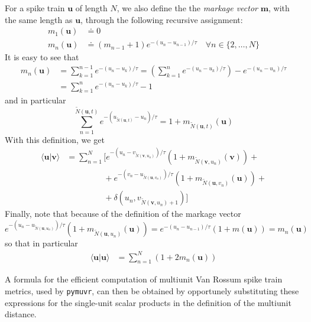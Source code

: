 \documentclass[11pt,a4paper]{article}
\newcommand{\braket}[2]{\langle #1|#2 \rangle}
\newcommand{\bu}{\boldsymbol{u}}
\newcommand{\bv}{\boldsymbol{v}}
\newcommand{\mkg}{\boldsymbol{m}}
\newcommand{\Nmax}[2]{\tilde{N}\left( #1, #2\right)}
\begin{document}
For a spike train $\bu$ of length $N$, we also define the the
\emph{markage vector} $\mkg$, with the same length as $\bu$, through
the following recursive assignment:
\begin{align}
  m_1(\bu) &\doteq 0 \\
  m_n(\bu) &\doteq \left(m_{n-1} + 1\right) e^{-(u_n - u_{n-1})/\tau}
  \quad \forall n \in \{2,\ldots,N\}\label{eq:markage_definition}
\end{align}
It is easy to see that
\begin{equation}
  \begin{split}
    m_n(\bu) &= \sum_{k=1}^{n-1}e^{-(u_n - u_k)/\tau} =
    \left(\sum_{k=1}^{n}e^{-(u_n - u_k)/\tau}\right) - e^{-(u_n - u_n)/\tau}\\
    &= \sum_{k=1}^{n}e^{-(u_n - u_k)/\tau} - 1
  \end{split}
\end{equation}
and in particular
\begin{equation}
  \label{eq:markage_sum}
  \sum_{n=1}^{\Nmax{\bu}{t}}e^{-(u_{\Nmax{\bu}{t}}-u_n)/\tau} = 1 + m_{\Nmax{\bu}{t}}(\bu)
\end{equation}
With this definition, we get
\begin{equation}
  \label{eq:singleunit_intprod_markage}
  \begin{split}
    \braket{\bu}{\bv} &= \sum_{n=1}^N \Bigg[
    e^{-(u_n-v_{\Nmax{\bv}{u_n}})/\tau} \left(1 + m_{\Nmax{\bv}{u_n}}(\bv)\right)
    + \\
    &\phantom{= \sum_{n=1}^N} + e^{-(v_n-u_{\Nmax{\bu}{v_n}})/\tau}
    \left(1 + m_{\Nmax{\bu}{v_n}}(\bu)\right) + \\
    &\phantom{= \sum_{n=1}^N} + 
    \delta\left(u_n,v_{\Nmax{\bv}{u_n}+1}\right) \Bigg]
  \end{split}
\end{equation}
Finally, note that because of the definition of the markage vector
\begin{equation*}
  e^{-(u_n-u_{\Nmax{\bu}{u_n}})/\tau} \left(1 +
    m_{\Nmax{\bu}{u_n}}(\bu)\right) = e^{-(u_n-u_{n-1})/\tau}\left(1+m(\bu)\right) = m_{n}(\bu)
\end{equation*}
so that in particular
\begin{equation}
  \label{eq:singleunit_squarenorm_markage}
  \begin{split}
    \braket{\bu}{\bu} &= \sum_{n=1}^N \left(1 + 2m_{n}(\bu)\right)
  \end{split}
\end{equation}

A formula for the efficient computation of multiunit Van Rossum spike
train metrics, used by \texttt{pymuvr}, can then be obtained by
opportunely substituting these expressions for the single-unit scalar
products in the definition of the multiunit distance.
\end{document}
